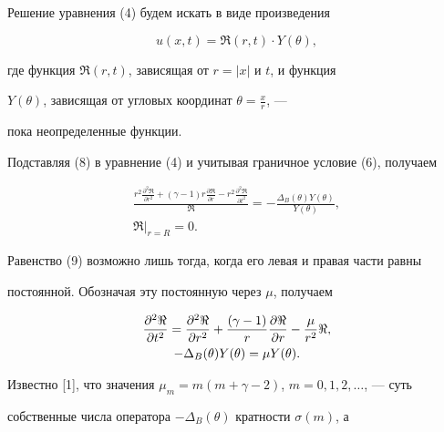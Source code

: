 Решение уравнения (4) будем искать в виде произведения  


\begin{equation}


u(x,t)=\Re(r,t)\cdot Y(\theta),


\end{equation}


где функция $\Re(r,t)$, зависящая от $r=|x|$ и $t$, и функция 


$Y(\theta)$, зависящая от угловых координат $\theta=\frac{x}{r}$, --- 


пока неопределенные функции. 


Подставляя (8) в уравнение (4) и учитывая граничное условие (6), получаем


\begin{gather}


\frac{r^{2}\frac{\partial^{2}\Re}


{\partial r^{2}}+(\gamma-1)r\frac{\partial\Re}


{\partial r}-r^{2}\frac{\partial^2\Re}{\partial t^2}}{\Re}=-\frac{\Delta_B


(\theta)Y(\theta)}{Y(\theta)}, \\


%


\Re\big|_{r=R}=0.


\end{gather}


Равенство (9) возможно лишь тогда, когда его левая и правая части равны 


постоянной. Обозначая эту постоянную через $\mu$, получаем


\begin{gather}


\frac{\partial^2\Re}{\partial t^2}=\frac{\partial^{2}\Re}{\partial r^{2}}+


\frac{(\gamma-1)}{r}\frac{\partial\Re}{\partial r}-\frac{\mu}{r^{2}}\Re,\\


%


-\Delta_B(\theta)Y(\theta)=\mu Y(\theta).\notag


\end{gather}





Известно [1], что значения $\mu_m=m(m+\gamma-2)$, $m=0,1,2,\dotsc$, --- суть 


собственные числа оператора $-\Delta_B(\theta)$ кратности $\sigma(m)$, а 


